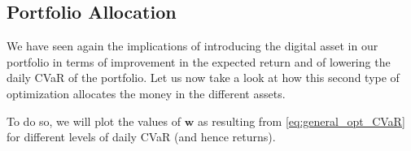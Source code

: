 \subsection{Portfolio Allocation}
We have seen again the implications of introducing the digital asset in our portfolio in terms of improvement in the expected return and of lowering the daily CVaR of the portfolio.
Let us now take a look at how this second type of optimization allocates the money in the different assets.

To do so, we will plot the values of $\mathbf{w}$ as resulting from \eqref{eq:general_opt_CVaR} for different levels of daily CVaR (and hence returns).



